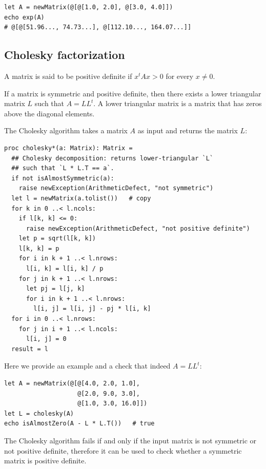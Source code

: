 \documentclass[justified, sixbynine]{tufte-book}
\def\ft{\small\tt}
\theoremstyle{plain}%
\newtheorem * {corollary}{Corollary}
\theoremstyle{definition}
\theoremstyle{remark}
\newtheorem * {remark}{Remark}
\newtheorem * {note}{Note}
\begin{document}
\begin{fullwidth}
\begin{lstlisting}
let A = newMatrix(@[@[1.0, 2.0], @[3.0, 4.0]])
echo exp(A)
# @[@[51.96..., 74.73...], @[112.10..., 164.07...]]
\end{lstlisting}

\goodbreak\subsection{Cholesky factorization}


A matrix is said to be positive definite if $x^t Ax>0$ for every $x\neq0$.

If a matrix is symmetric and positive definite, then there exists a lower triangular matrix $L$ such that $A=L L^t$. A lower triangular matrix is a matrix that has zeros above the diagonal elements.

The Cholesky algorithm takes a matrix $A$ as input and returns the matrix $L$:

\begin{lstlisting}[caption={in file: {\ft nlib.nim}}]
proc cholesky*(a: Matrix): Matrix =
  ## Cholesky decomposition: returns lower-triangular `L`
  ## such that `L * L.T == a`.
  if not isAlmostSymmetric(a):
    raise newException(ArithmeticDefect, "not symmetric")
  let l = newMatrix(a.tolist())   # copy
  for k in 0 ..< l.ncols:
    if l[k, k] <= 0:
      raise newException(ArithmeticDefect, "not positive definite")
    let p = sqrt(l[k, k])
    l[k, k] = p
    for i in k + 1 ..< l.nrows:
      l[i, k] = l[i, k] / p
    for j in k + 1 ..< l.nrows:
      let pj = l[j, k]
      for i in k + 1 ..< l.nrows:
        l[i, j] = l[i, j] - pj * l[i, k]
  for i in 0 ..< l.nrows:
    for j in i + 1 ..< l.ncols:
      l[i, j] = 0
  result = l
\end{lstlisting}

Here we provide an example and a check that indeed $A=L L^t$:

\begin{lstlisting}
let A = newMatrix(@[@[4.0, 2.0, 1.0],
                    @[2.0, 9.0, 3.0],
                    @[1.0, 3.0, 16.0]])
let L = cholesky(A)
echo isAlmostZero(A - L * L.T())   # true
\end{lstlisting}

The Cholesky algorithm fails if and only if the input matrix is not symmetric or not positive definite, therefore it can be used to check whether a symmetric matrix is positive definite.


\end{fullwidth}
\end{document}
